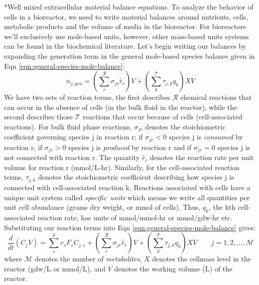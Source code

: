 \documentclass[11pt]{article}
\makeatletter
\theoremstyle{definition}
\renewcommand\subsection{\@startsection
	{subsection}{2}{0mm}
	{-0.05in}
	{-0.5\baselineskip}
	{\normalfont\normalsize\bfseries}}
\makeatother
\begin{document}
\subsection*{Well mixed extracellular material balance equations.}
To analyze the behavior of cells in a bioreactor, we need to write material balances around nutrients, cells, metabolic products and the volume of media in the bioreactor.
For bioreactors we'll exclusively use mole-based units, however, other mass-based units systems can be found in the biochemical literature.
Let's begin writing our balances by expanding the generation term in the general mole-based species balance given in Eqn \eqref{eqn:general-species-mole-balance}:
\begin{equation}
\dot{n}_{j,gen} = \left(\sum_{r}^{\mathcal{R}}\sigma_{jr}\hat{r}_{r}\right)V+\left(\sum_{k}^{\mathcal{T}}\tau_{j,k}q_{k}\right)XV
\end{equation}We have two sets of reaction terms, the first describes $\mathcal{R}$ chemical reactions that can occur in the absence of cells (in the bulk fluid in the reactor), while the second
describes those $\mathcal{T}$ reactions that occur because of cells (cell-associated reactions). For bulk fluid phase reactions, $\sigma_{jr}$ denotes the stoichiometric coefficient governing species j in reaction r;
if $\sigma_{jr}<0$ species j is \textit{consumed} by reaction r, if $\sigma_{jr}>0$ species j is \textit{produced} by reaction r and if $\sigma_{jr}=0$ species j is not connected with reaction r.
The quantity $\hat{r}_{r}$ denotes the reaction rate per unit volume for reaction r (mmol/L-hr).
Similarly, for the cell-associated reaction terms, $\tau_{j,k}$ denotes the stoichiometric coefficient describing how species j is connected with cell-associated reaction k.
Reactions associated with cells have a unique unit system called \textit{specific~units} which means we write all quantities per unit cell abundance (grams dry weight, or mmol of cells).
Thus, $q_{k}$, the kth cell-associated reaction rate, has units of mmol/mmol-hr or mmol/gdw-hr etc. Substituting our reaction terms into Eqn \eqref{eqn:general-species-mole-balance} gives:
\begin{equation}\label{eqn:general-balances}
\frac{d}{dt}\left(C_{j}V\right) = \sum_{s}^{\mathcal{S}}v_{s}F_{s}C_{j,s} + \left(\sum_{r}^{\mathcal{R}}\sigma_{jr}\hat{r}_{r}\right)V+\left(\sum_{k}^{\mathcal{T}}\tau_{j,k}q_{k}\right)XV \qquad j=1,2,\dots,\mathcal{M}
\end{equation}where $\mathcal{M}$ denotes the number of \textit{metabolites}, $X$ denotes the cellmass level in the reactor (gdw/L or mmol/L), and $V$ denotes the working volume (L) of the reactor.
\end{document}
